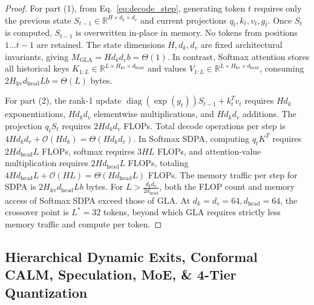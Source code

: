 \documentclass[10pt,twocolumn,letterpaper]{article}
\begin{document}
\begin{proof}
For part (1), from Eq.~\eqref{eq:decode_step}, generating token $t$ requires only the previous state $S_{t-1} \in \mathbb{R}^{H \times d_k \times d_v}$ and current projections $q_t, k_t, v_t, g_t$. Once $S_t$ is computed, $S_{t-1}$ is overwritten in-place in memory. No tokens from positions $1 \dots t-1$ are retained. The state dimensions $H, d_k, d_v$ are fixed architectural invariants, giving $M_{\text{GLA}} = H d_k d_v b = \Theta(1)$. In contrast, Softmax attention stores all historical keys $K_{1:L} \in \mathbb{R}^{L \times H_{\text{kv}} \times d_{\text{head}}}$ and values $V_{1:L} \in \mathbb{R}^{L \times H_{\text{kv}} \times d_{\text{head}}}$, consuming $2 H_{\text{kv}} d_{\text{head}} L b = \Theta(L)$ bytes.

For part (2), the rank-1 update $\operatorname{diag}(\exp(g_t)) S_{t-1} + k_t^T v_t$ requires $H d_k$ exponentiations, $H d_k d_v$ elementwise multiplications, and $H d_k d_v$ additions. The projection $q_t S_t$ requires $2 H d_k d_v$ FLOPs. Total decode operations per step is $4 H d_k d_v + \mathcal{O}(H d_k) = \Theta(H d_k d_v)$. In Softmax SDPA, computing $q_t K^T$ requires $2 H d_{\text{head}} L$ FLOPs, softmax requires $3 H L$ FLOPs, and attention-value multiplication requires $2 H d_{\text{head}} L$ FLOPs, totaling $4 H d_{\text{head}} L + \mathcal{O}(H L) = \Theta(H d_{\text{head}} L)$ FLOPs. The memory traffic per step for SDPA is $2 H_{\text{kv}} d_{\text{head}} L b$ bytes. For $L > \frac{d_k d_v}{2 d_{\text{head}}}$, both the FLOP count and memory access of Softmax SDPA exceed those of GLA. At $d_k=d_v=64, d_{\text{head}}=64$, the crossover point is $L^* = 32$ tokens, beyond which GLA requires strictly less memory traffic and compute per token.
\end{proof}

\subsection{Hierarchical Dynamic Exits, Conformal CALM, Speculation, MoE, \& 4-Tier Quantization}
\end{document}
